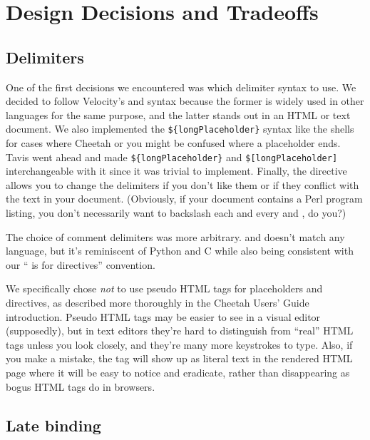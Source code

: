 \section{Design Decisions and Tradeoffs}
\label{design}


\subsection{Delimiters}
\label{design.Delimiters}

One of the first decisions we encountered was which delimiter syntax to use.
We decided to follow Velocity's  and 
syntax because the former is widely used in other languages for the same
purpose, and the latter stands out in an HTML or text document.  We also
implemented the \verb+${longPlaceholder}+ syntax like the shells for cases
where Cheetah or you might be confused where a placeholder ends.  Tavis went
ahead and made \verb+${longPlaceholder}+ and \verb+$[longPlaceholder]+
interchangeable with it since it was trivial to implement.  Finally,
the  directive allows you to change the delimiters if you
don't like them or if they conflict with the text in your document.
(Obviously, if your document contains a Perl program listing, you don't 
necessarily want to backslash each and every \code{\$} and \code{\#}, do you?)

The choice of comment delimiters was more arbitrary.  \code{\#\#} and
\code{\#* \ldots *\#} doesn't match any language, but it's reminiscent of
Python and C while also being consistent with our ``\code{\#} is for
directives'' convention.

We specifically chose {\em not} to use pseudo HTML tags for placeholders and
directives, as described more thoroughly in the Cheetah Users' Guide
introduction.  Pseudo HTML tags may be easier to see in a visual editor
(supposedly), but in text editors they're hard to distinguish from ``real''
HTML tags unless you look closely, and they're many more keystrokes to type.
Also, if you make a mistake, the tag will show up as literal text in the
rendered HTML page where it will be easy to notice and eradicate, rather than
disappearing as bogus HTML tags do in browsers.

\subsection{Late binding}
\label{design.lateBinding}

